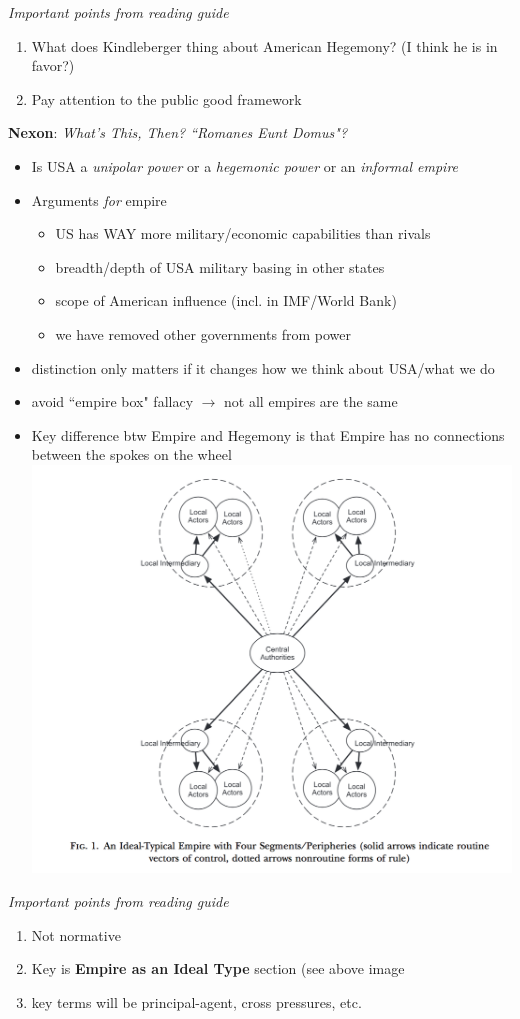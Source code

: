 \documentclass{article}
\begin{document}
\textit{Important points from reading guide}
\begin{enumerate}
    \item What does Kindleberger thing about American Hegemony? (I think he is in favor?)
    \item Pay attention to the public good framework
\end{enumerate}
\bigskip
\textbf{Nexon}: \textit{What's This, Then? ``Romanes Eunt Domus"?}
\begin{itemize}
    \item Is USA a \textit{unipolar power} or a \textit{hegemonic power} or an \textit{informal empire}
    \item Arguments \textit{for} empire
    \begin{itemize}
        \item US has WAY more military/economic capabilities than rivals
        \item breadth/depth of USA military basing in other states
        \item scope of American influence (incl. in IMF/World Bank)
        \item we have removed other governments from power
    \end{itemize}
    \item distinction only matters if it changes how we think about USA/what we do
    \item avoid ``empire box" fallacy $\rightarrow$ not all empires are the same
    \item Key difference btw Empire and Hegemony is that Empire has no connections between the spokes on the wheel\\
    \includegraphics[width=\textwidth]{empire.png}
\end{itemize}
\textit{Important points from reading guide}
\begin{enumerate}
    \item Not normative
    \item Key is \textbf{Empire as an Ideal Type} section (see above image
    \item key terms will be principal-agent, cross pressures, etc.
\end{enumerate}
\end{document}
